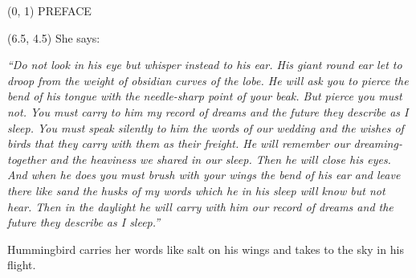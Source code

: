 \documentclass[10pt]{article}
\begin{document}
\begin{textblock}{23}(0, 1)
\center \huge PREFACE
\end{textblock}

\begin{textblock}{10}(6.5, 4.5)
She says:

\textit{``Do not look in his eye but whisper instead to his ear. His giant
round ear let to droop from the weight of obsidian curves of the lobe. He will
ask you to pierce the bend of his tongue with the needle-sharp point of
your beak. But pierce you must not. You must carry to him my record of dreams
and the future they describe as I sleep. You must speak silently to him the
words of our wedding and the wishes of birds that they carry with them as their
freight. He will remember our dreaming-together and the heaviness we shared in
our sleep. Then he will close his eyes. And when he does you must brush with
your wings the bend of his ear and leave there like sand the husks of my words
which he in his sleep will know but not hear. Then in the daylight he will
carry with him our record of dreams and the future they describe as I sleep.''}

Hummingbird carries her words like salt on his wings and takes to the sky in
his flight.

\end{textblock}
\end{document}
